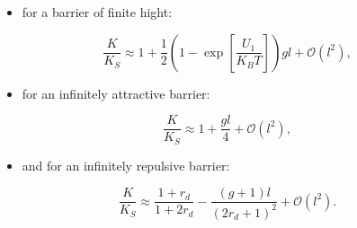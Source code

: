 \begin{itemize}
    \item for a barrier of finite hight:
\end{itemize}
\begin{equation}
    \frac{K}{K_S} \approx 1 + \frac{1}{2}\left(1- \exp\left[\frac{U_1}{K_B T}\right]\right)gl + \mathcal{O}(l^{2}),
    \label{llim_finite}
\end{equation}
\newpage
\begin{itemize}
    \item for an infinitely attractive barrier:
\end{itemize}
\begin{equation}
    \frac{K}{K_S} \approx 1 + \frac{gl}{4} + \mathcal{O}(l^{2}),
    \label{llim_att}
\end{equation}
\begin{itemize}
    \item and for an infinitely repulsive barrier:
\end{itemize}
\begin{equation}
    \frac{K}{K_S} \approx \frac{1+r_d}{1 + 2 r_d} - \frac{(g+1)l}{(2r_d+1)^{2}} + \mathcal{O}(l^{2}).
    \label{llim_rep}
\end{equation}

